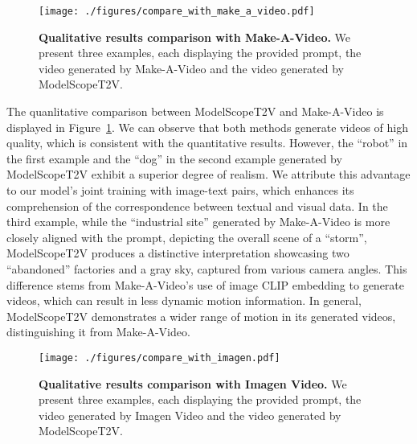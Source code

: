 \begin{figure}[htb]
        \centering
        \texttt{[image: ./figures/compare\_with\_make\_a\_video.pdf]}
        \caption{
        \textbf{Qualitative results comparison with Make-A-Video.}
        We present three examples, each displaying the provided prompt, the video generated by Make-A-Video and the video generated by ModelScopeT2V.
        }
        \label{fig:compare_with_make_a_video}
\end{figure}


The quanlitative comparison between ModelScopeT2V and Make-A-Video is displayed in Figure~\ref{fig:compare_with_make_a_video}.
We can observe that both methods generate videos of high quality, which is consistent with the quantitative results. 
However, the ``robot'' in the first example and the ``dog'' in the second example generated by ModelScopeT2V exhibit a superior degree of realism.
We attribute this advantage to our model's joint training with image-text pairs, which enhances its comprehension of the correspondence between textual and visual data.
In the third example, while the ``industrial site'' generated by Make-A-Video is more closely aligned with the prompt, depicting the overall scene of a ``storm'', ModelScopeT2V produces a distinctive interpretation showcasing two ``abandoned'' factories and a gray sky, captured from various camera angles.
This difference stems from Make-A-Video's use of image CLIP embedding to generate videos, which can result in less dynamic motion information.
In general, ModelScopeT2V demonstrates a wider range of motion in its generated videos, distinguishing it from Make-A-Video.










\begin{figure}[htb]
        \centering
        \texttt{[image: ./figures/compare\_with\_imagen.pdf]}
        \caption{
        \textbf{Qualitative results comparison with Imagen Video.}
        We present three examples, each displaying the provided prompt, the video generated by Imagen Video and the video generated by ModelScopeT2V.
        }
        \label{fig:compare_with_imagen}
\end{figure}



